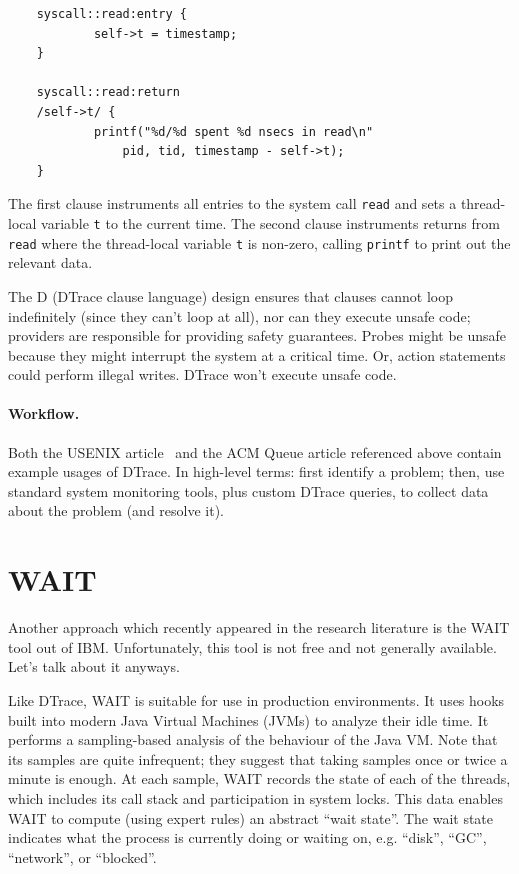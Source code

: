 \documentclass[11pt]{article}
\begin{document}
{\scriptsize \begin{verbatim}
    syscall::read:entry {
            self->t = timestamp;
    }

    syscall::read:return
    /self->t/ {
            printf("%d/%d spent %d nsecs in read\n"
                pid, tid, timestamp - self->t);
    }
    \end{verbatim}
}

The first clause instruments all entries to the system call {\tt read}
and sets a thread-local variable {\tt t} to the current time. The
second clause instruments returns from {\tt read} where the
thread-local variable {\tt t} is non-zero, calling {\tt printf} to print out
the relevant data.

The D (DTrace clause language) design ensures that clauses cannot loop indefinitely
(since they can't loop at all), nor can they execute unsafe code;
providers are responsible for providing safety guarantees. Probes
might be unsafe because they might interrupt the system at a critical
time. Or, action statements could perform illegal writes. DTrace won't 
execute unsafe code.

\paragraph{Workflow.} Both the USENIX article~\cite{Cantrill:2004:DIP:1247415.1247417} and the
ACM Queue article referenced above contain example usages of DTrace.
In high-level terms: first identify a problem; then, use
standard system monitoring tools, plus custom DTrace queries,
to collect data about the problem (and resolve it).

\section*{WAIT}
Another approach which recently appeared in the research literature is
the WAIT tool out of IBM. Unfortunately, this tool is not free and not
generally available. Let's talk about it anyways.

Like DTrace, WAIT is suitable for use in production environments. It
uses hooks built into modern Java Virtual Machines (JVMs) to analyze
their idle time. It performs a sampling-based analysis of the
behaviour of the Java VM. Note that its samples are quite infrequent;
they suggest that taking samples once or twice a minute is enough.  At
each sample, WAIT records the state of each of the threads, which
includes its call stack and participation in system locks. This data
enables WAIT to compute (using expert rules) an abstract ``wait
state''.  The wait state indicates what the process is currently doing
or waiting on, e.g. ``disk'', ``GC'', ``network'', or ``blocked''.
\end{document}
